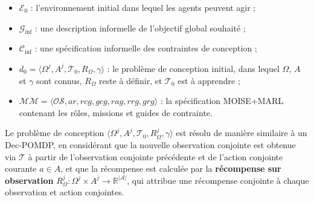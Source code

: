 \begin{itemize}
    \item $\mathcal{E}_0$ : l'environnement initial dans lequel les agents peuvent agir ;
    \item $\mathcal{G}_{\text{inf}}$ : une description informelle de l'objectif global souhaité ;
    \item $\mathcal{C}_{\text{inf}}$ : une spécification informelle des contraintes de conception ;
    \item $d_0 = \langle \Omega^j, A^j, \mathcal{T}_0, R_{\Omega}, \gamma \rangle$ : le problème de conception initial, dans lequel $\Omega$, $A$ et $\gamma$ sont connus, $R_{\Omega}$ reste à définir, et $\mathcal{T}_0$ est à apprendre ;
    \item $\mathcal{MM} = \langle \mathcal{OS}, ar, rcg, gcg, rag, rrg, grg \rangle$ : la spécification MOISE+MARL contenant les rôles, missions et guides de contrainte.
\end{itemize}

Le problème de conception $\langle \Omega^j, A^j, \mathcal{T}_0, R_{\Omega}^j, \gamma \rangle$ est résolu de manière similaire à un Dec-POMDP, en considérant que la nouvelle observation conjointe est obtenue via $\mathcal{T}$ à partir de l'observation conjointe précédente et de l'action conjointe courante $a \in A$, et que la récompense est calculée par la \textbf{récompense sur observation} $R^j_{\Omega}: \Omega^j \times A^j \rightarrow \mathbb{R}^{|\mathcal{A}|}$, qui attribue une récompense conjointe à chaque observation et action conjointes.

\vspace{1em}

